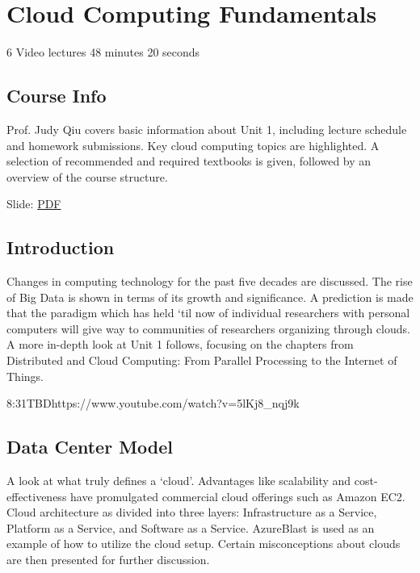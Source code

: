 \chapter{Cloud Computing Fundamentals}

  6 Video lectures {48 minutes 20 seconds}

\section{Course Info}

Prof. Judy Qiu covers basic information about Unit 1, including lecture
schedule and homework submissions. Key cloud computing topics are
highlighted. A selection of recommended and required textbooks is given,
followed by an overview of the course structure.


  Slide:
  \href{https://drive.google.com/open?id=0B88HKpainTSfYjU4QzdDSms0Nk0}{PDF}

\section{Introduction}

Changes in computing technology for the past five decades are discussed.
The rise of Big Data is shown in terms of its growth and significance. A
prediction is made that the paradigm which has held `til now of
individual researchers with personal computers will give way to
communities of researchers organizing through clouds. A more in-depth
look at Unit 1 follows, focusing on the chapters from Distributed and
Cloud Computing: From Parallel Processing to the Internet of Things.

  {8:31}{TBD}{https://www.youtube.com/watch?v=5lKj8_nqj9k}


\section{Data Center Model}

A look at what truly defines a `cloud'. Advantages like scalability and
cost-effectiveness have promulgated commercial cloud offerings such as
Amazon EC2. Cloud architecture as divided into three layers:
Infrastructure as a Service, Platform as a Service, and Software as a
Service. AzureBlast is used as an example of how to utilize the cloud
setup. Certain misconceptions about clouds are then presented for
further discussion.

